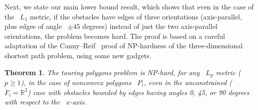 \documentclass[11pt]{article}
\newtheorem{theorem}{Theorem}
\begin{document}
Next, we state our main lower bound result, which shows that even in the case of the ~\(L_1\) metric, if the obstacles have edges of three orientations (axis-parallel, plus edges of angle ~\(\pm 45\) degrees) instead of just the two axis-parallel orientations, the problem becomes hard.
The proof is based on a careful adaptation of the Canny--Reif~\cite{ref4} proof of NP-hardness of the three-dimensional shortest path problem, using some new gadgets.

\begin{theorem}
The touring polygons problem is NP-hard, for any ~\(L_p\) metric (~\(p \ge 1\)), in the case of nonconvex polygons ~\(P_i\), even in the unconstrained (~\(F_i = \mathbb{R}^2\)) case with obstacles bounded by edges having angles 0, 45, or 90 degrees with respect to the ~\(x\)-axis.
\end{theorem}
\end{document}
